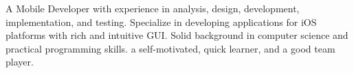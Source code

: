 \documentclass[letter,10pt]{article}
\begin{document}



A Mobile Developer with experience in analysis, design, development, implementation, and testing. Specialize in developing applications for iOS platforms with rich and intuitive GUI. Solid background in computer science and practical programming skills. a self-motivated, quick learner, and a good team player.
\end{document}
